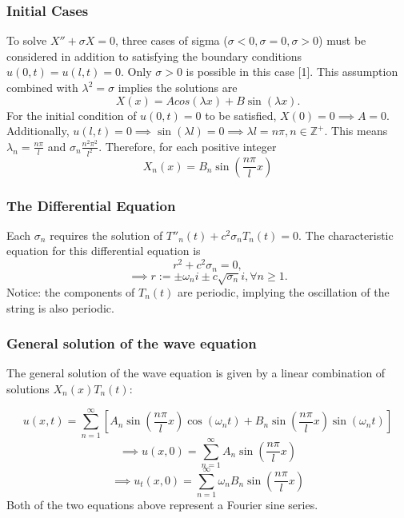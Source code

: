 \documentclass{article}
\begin{document}
\subsubsection{Initial Cases}
To solve $X''+\sigma X = 0$, three cases of sigma ($\sigma < 0, \sigma = 0, \sigma >0$) must be considered in addition to satisfying the boundary conditions $u(0,t)=u(l,t)=0$. Only $\sigma > 0$ is possible in this case [1].  This assumption combined with $\lambda^2 = \sigma$ implies the solutions are
\begin{equation*}
	X(x)=Acos(\lambda x)+B\sin(\lambda x).
\end{equation*}
For the initial condition of $u(0,t)=0$ to be satisfied, $X(0)=0 \implies A=0$. Additionally, $u(l,t)=0 \implies \sin(\lambda l) = 0 \implies \lambda l = n\pi, n \in \mathbb{Z}^{+}$. This means $\lambda_n = \frac{n\pi}{l}$ and $\sigma_n \frac{n^2 \pi ^2}{l^2}$. Therefore, for each positive integer
\begin{equation*}
	X_n(x)=B_n \sin(\frac{n\pi}{l} x)
\end{equation*}
\subsubsection{The Differential Equation}
Each $\sigma_n$ requires the solution of $T''_n(t) +c^2 \sigma_n T_n(t)=0$. The characteristic equation for this differential equation is
\begin{equation*}
r^2+c^2 \sigma_n=0,
\end{equation*}\begin{equation*}
\implies r:= \pm \omega_n i \pm c\sqrt{\sigma_n}i, \forall n \ge 1.
\end{equation*}
Notice: the components of $T_n(t)$ are periodic, implying the oscillation of the string is also periodic.

\subsubsection{General solution of the wave equation}
The general solution of the wave equation is given by a linear combination of solutions $X_n(x)T_n(t):$

\begin{equation*}
	u(x,t)=\sum_{n=1}^{\infty}[A_n \sin(\frac{n\pi}{l}x)\cos(\omega_n t)+B_n\sin(\frac{n\pi}{l}x)\sin(\omega_n t)]
\end{equation*}
\begin{equation*}
\implies  u(x,0)= \sum_{n=1}^{\infty} A_n \sin(\frac{n\pi}{l}x)
\end{equation*}
\begin{equation*}
\implies  u_t(x,0)= \sum_{n=1}^{\infty} \omega_n B_n \sin(\frac{n\pi}{l}x)
\end{equation*}Both  of the two equations above represent a Fourier sine series.
\end{document}
